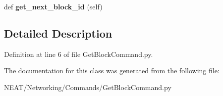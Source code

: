 \begin{DoxyCompactItemize}
\item 
def {\bfseries get\+\_\+next\+\_\+block\+\_\+id} (self)\hypertarget{class_n_e_a_t___py_genetics_1_1_n_e_a_t_1_1_networking_1_1_commands_1_1_get_block_command_1_1_get_block_command_a97eb16c91c2ebb7081518119585f55fe}{}\label{class_n_e_a_t___py_genetics_1_1_n_e_a_t_1_1_networking_1_1_commands_1_1_get_block_command_1_1_get_block_command_a97eb16c91c2ebb7081518119585f55fe}

\end{DoxyCompactItemize}


\subsection{Detailed Description}


Definition at line 6 of file Get\+Block\+Command.\+py.



The documentation for this class was generated from the following file\+:\begin{DoxyCompactItemize}
\item 
N\+E\+A\+T/\+Networking/\+Commands/Get\+Block\+Command.\+py\end{DoxyCompactItemize}
